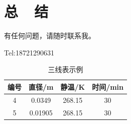 \documentclass{MyLatex}
\begin{document}
\section{总~~结}
有任何问题，请随时联系我。

Tel:18721290631







\begin{table}[H]
\centering
\captionnamefont{\wuhao\bf\heiti}
\captiontitlefont{\wuhao\bf\heiti}
\caption{三线表示例} \label{tab:eg1}
\liuhao
\begin{tabular}{cccc}
\toprule
{编号} &  {直径}/\si{\metre} & {静温}/\si{\kelvin} & {时间}/min\\
\midrule 
4 & 0.0349 & 268.15 & 30\\
5 & 0.01905 & 268.15 & 30\\
\bottomrule
\end{tabular}
\end{table}


\end{document}
